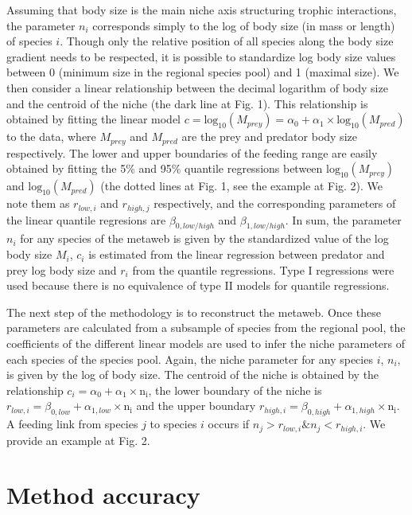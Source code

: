 \documentclass[12pt]{article}
\begin{document}
Assuming that body size is the main niche axis structuring trophic interactions,
the parameter $n_i$ corresponds simply to the log of body size (in mass or
length) of species $i$. Though only the relative position of all species along
the body size gradient needs to be respected, it is possible to standardize log
body size values between 0 (minimum size in the regional species pool) and 1
(maximal size). We then consider a linear relationship between the decimal
logarithm of body size and the centroid of the niche (the dark line at Fig. 1).
This relationship is obtained by fitting the linear model $c =
\mathrm{log}_{10}(M_{prey})=\alpha_0 +
\alpha_1\times\mathrm{log}_{10}(M_{pred})$ to the data, where $M_{prey}$ and
$M_{pred}$ are the prey and predator body size respectively. The lower and upper
boundaries of the feeding range are easily obtained by fitting the 5\% and 95\%
quantile regressions between $\mathrm{log}_{10}(M_{prey})$ and
$\mathrm{log}_{10}(M_{pred})$ (the dotted lines at Fig. 1, see the example at
Fig. 2). We note them as $r_{low,i}$ and $r_{high,j}$ respectively, and the
corresponding parameters of the linear quantile regresions are
$\beta_{0,low/high}$ and $\beta_{1,low/high}$. In sum, the parameter $n_i$ for
any species of the metaweb is given by the standardized value of the log body
size $M_i$, $c_i$ is estimated from the linear regression between predator and
prey log body size and $r_i$ from the quantile regressions. Type I regressions
were used because there is no equivalence of type II models for quantile
regressions.

The next step of the methodology is to reconstruct the metaweb. Once these
parameters are calculated from a subsample of species from the regional pool,
the coefficients of the different linear models are used to infer the niche
parameters of each species of the species pool. Again, the niche parameter for
any species $i$, $n_i$, is given by the log of body size. The centroid of the
niche is obtained by the relationship $c_i = \alpha_0 +
\alpha_1\times\mathrm{n_i}$, the lower boundary of the niche is $r_{low,i} =
\beta_{0,low} + \alpha_{1,low}\times\mathrm{n_i}$ and the upper boundary
$r_{high,i} = \beta_{0,high} + \alpha_{1,high}\times\mathrm{n_i}$. A feeding
link from species $j$ to species $i$ occurs if $n_j > r_{low,i} \& n_j <
r_{high,i}$. We provide an example at Fig. 2.

\section{Method accuracy}
\end{document}
